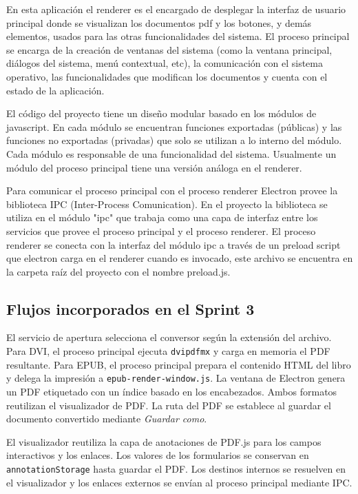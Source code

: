 En esta aplicación el renderer es el encargado de desplegar la interfaz de usuario principal donde se  visualizan los documentos pdf y los botones, y demás elementos, usados para las otras funcionalidades del sistema. El proceso principal se encarga de la creación de ventanas del sistema (como la ventana principal, diálogos del sistema, menú contextual, etc), la comunicación con el sistema operativo, las funcionalidades que modifican los documentos y cuenta con el estado de la aplicación.

El código del proyecto tiene un diseño modular basado en los módulos de javascript. En cada módulo se encuentran funciones exportadas (públicas) y las funciones no exportadas (privadas) que solo se utilizan a lo interno del módulo. Cada módulo es responsable de una funcionalidad del sistema. Usualmente un módulo del proceso principal tiene una versión análoga en el renderer.

Para comunicar el proceso principal con el proceso renderer Electron provee la biblioteca IPC (Inter-Process Comunication)\cite{electron_ipc}. En el proyecto la biblioteca se utiliza en el módulo "ipc" que trabaja como una capa de interfaz entre los servicios que provee el proceso principal y el proceso renderer. El proceso renderer se conecta con la interfaz del módulo ipc a través de un preload script que electron carga en el renderer cuando es invocado, este archivo se encuentra en la carpeta raíz del proyecto con el nombre preload.js.\cite{electron_ipc}

\subsection{Flujos incorporados en el Sprint 3}

El servicio de apertura selecciona el conversor según la extensión del archivo. Para DVI, el proceso principal ejecuta \texttt{dvipdfmx} y carga en memoria el PDF resultante. Para EPUB, el proceso principal prepara el contenido HTML del libro y delega la impresión a \texttt{epub-render-window.js}. La ventana de Electron genera un PDF etiquetado con un índice basado en los encabezados. Ambos formatos reutilizan el visualizador de PDF. La ruta del PDF se establece al guardar el documento convertido mediante \emph{Guardar como}.

El visualizador reutiliza la capa de anotaciones de PDF.js para los campos interactivos y los enlaces. Los valores de los formularios se conservan en \texttt{annotationStorage} hasta guardar el PDF. Los destinos internos se resuelven en el visualizador y los enlaces externos se envían al proceso principal mediante IPC.

